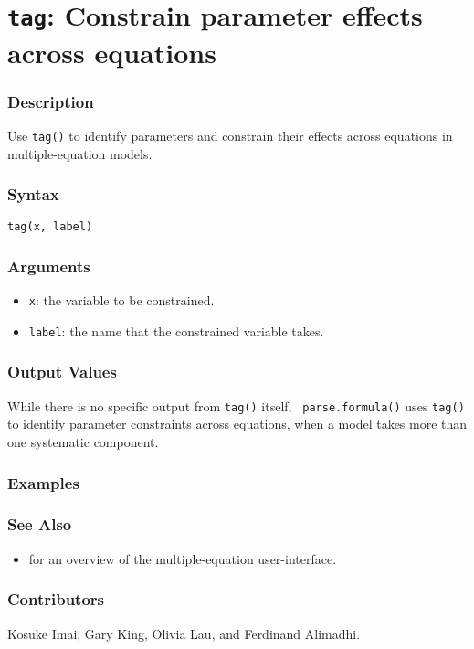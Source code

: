 \section{{\tt tag}: Constrain parameter effects across equations}
\label{tag}

\subsubsection{Description}
Use {\tt tag()} to identify parameters and constrain their effects
across equations in multiple-equation models.  
  
\subsubsection{Syntax}
\begin{verbatim}
tag(x, label)
\end{verbatim}

\subsubsection{Arguments}
\begin{itemize}
\item {\tt x}: the variable to be constrained.
\item {\tt label}: the name that the constrained variable takes.  
\end{itemize}

\subsubsection{Output Values}
While there is no specific output from {\tt tag()} itself, {\tt
parse.formula()} uses {\tt tag()} to identify parameter constraints
across equations, when a model takes more than one systematic
component.  

\subsubsection{Examples}

\subsubsection{See Also}
\begin{itemize}
\item {} for an overview of the multiple-equation user-interface.
\end{itemize}

\subsubsection{Contributors}

Kosuke Imai, Gary King, Olivia Lau, and Ferdinand Alimadhi.














